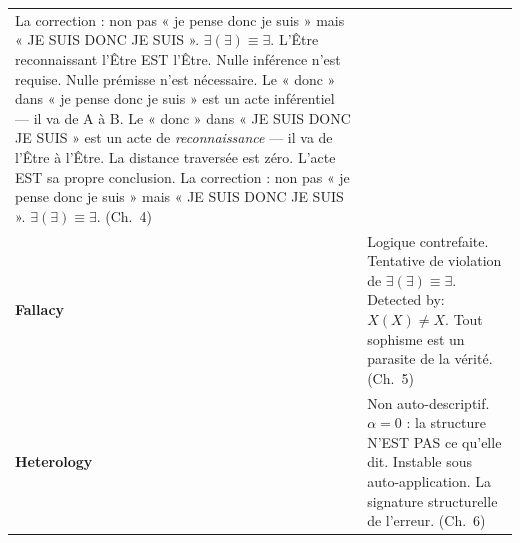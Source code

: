 \documentclass[10pt, openany, oneside]{book}
\begin{document}
{\begin{tabular}{@{} l @{\hspace{0.6em}} p{} @{}}
La correction : non pas « je pense donc je suis » mais « JE SUIS DONC JE SUIS ». $\exists(\exists) \equiv \exists$. L'Être reconnaissant l'Être EST l'Être. Nulle inférence n'est requise. Nulle prémisse n'est nécessaire. Le « donc » dans « je pense donc je suis » est un acte inférentiel --- il va de A à B. Le « donc » dans « JE SUIS DONC JE SUIS » est un acte de \textit{reconnaissance} --- il va de l'Être à l'Être. La distance traversée est zéro. L'acte EST sa propre conclusion. La correction : non pas « je pense donc je suis » mais « JE SUIS DONC JE SUIS ». $\exists(\exists) \equiv \exists$. (Ch.\ 4) \\[0.3em]
\textbf{Fallacy} & Logique contrefaite. Tentative de violation de $\exists(\exists) \equiv \exists$. Detected by: $X(X) \neq X$. Tout sophisme est un parasite de la vérité. (Ch.\ 5) \\[0.3em]
\textbf{Heterology} & Non auto-descriptif. $\alpha = 0$ : la structure N'EST PAS ce qu'elle dit. Instable sous auto-application. La signature structurelle de l'erreur. (Ch.\ 6) \\[0.3em]
\end{tabular}
}

\pagebreak
\end{document}
